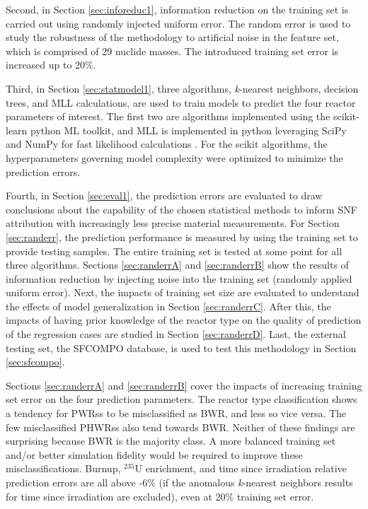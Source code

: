 Second, in Section \ref{sec:inforeduc1}, information reduction on the training
set is carried out using randomly injected uniform error. The random error is
used to study the robustness of the methodology to artificial noise in the
feature set, which is comprised of 29 nuclide masses.  The introduced training
set error is increased up to 20\%.

Third, in Section \ref{sec:statmodel1}, three algorithms, \textit{k}-nearest
neighbors, decision trees, and \gls{MLL} calculations, are used to train models
to predict the four reactor parameters of interest.  The first two are
algorithms implemented using the scikit-learn python \gls{ML} toolkit, and
\gls{MLL} is implemented in python leveraging SciPy and NumPy for fast
likelihood calculations \cite{scikit, scipy, numpy}.  For the scikit
algorithms, the hyperparameters governing model complexity were optimized to
minimize the prediction errors.  

Fourth, in Section \ref{sec:eval1}, the prediction errors are evaluated to draw
conclusions about the capability of the chosen statistical methods to inform
\gls{SNF} attribution with increasingly less precise material measurements.
For Section \ref{sec:randerr}, the prediction performance is measured by using
the training set to provide testing samples. The entire training set is tested
at some point for all three algorithms.  Sections \ref{sec:randerrA} and
\ref{sec:randerrB} show the results of information reduction by injecting noise
into the training set (randomly applied uniform error).  Next, the impacts of
training set size are evaluated to understand the effects of model
generalization in Section \ref{sec:randerrC}. After this, the impacts of having
prior knowledge of the reactor type on the quality of prediction of the
regression cases are studied in Section \ref{sec:randerrD}.  Last, the external
testing set, the \gls{SFCOMPO} database, is used to test this methodology in
Section \ref{sec:sfcompo}. 

Sections \ref{sec:randerrA} and \ref{sec:randerrB} cover the impacts of
increasing training set error on the four prediction parameters.  The reactor
type classification shows a tendency for \glspl{PWR}s to be misclassified as
\gls{BWR}, and less so vice versa. The few misclassified \glspl{PHWR}s also
tend towards \gls{BWR}. Neither of these findings are surprising because
\gls{BWR} is the majority class. A more balanced training set and/or better
simulation fidelity would be required to improve these misclassifications.
Burnup, ${}^{235}\text{U}$ enrichment, and time since irradiation relative
prediction errors are all above -6\% (if the anomalous \textit{k}-nearest
neighbors results for time since irradiation are excluded), even at 20\%
training set error.

